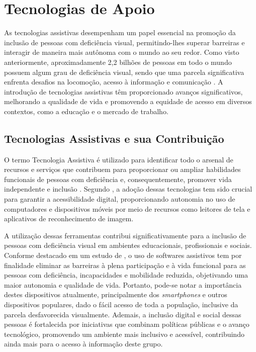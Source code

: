 \section{Tecnologias de Apoio}

As tecnologias assistivas desempenham um papel essencial na promoção da inclusão de pessoas com deficiência visual, permitindo-lhes superar barreiras e interagir de maneira mais autônoma com o mundo ao seu redor. Como visto anteriormente, aproximadamente 2,2 bilhões de pessoas em todo o mundo possuem algum grau de deficiência visual, sendo que uma parcela significativa enfrenta desafios na locomoção, acesso à informação e comunicação \cite{WHO2023}. A introdução de tecnologias assistivas têm proporcionado avanços significativos, melhorando a qualidade de vida e promovendo a equidade de acesso em diversos contextos, como a educação e o mercado de trabalho.

\subsection{Tecnologias Assistivas e sua Contribuição}

O termo Tecnologia Assistiva é utilizado para identificar todo o arsenal de recursos e serviços que contribuem para proporcionar ou ampliar habilidades funcionais de pessoas com deficiência e, consequentemente, promover vida independente e inclusão \cite{bersch2024}. Segundo , a adoção dessas tecnologias tem sido crucial para garantir a acessibilidade digital, proporcionando autonomia no uso de computadores e dispositivos móveis por meio de recursos como leitores de tela e aplicativos de reconhecimento de imagem.

A utilização dessas ferramentas contribui significativamente para a inclusão de pessoas com deficiência visual em ambientes educacionais, profissionais e sociais. Conforme destacado em um estudo de , o uso de softwares assistivos tem por finalidade eliminar as barreiras à plena participação e à vida funcional para as pessoas com deficiência, incapacidades e mobilidade reduzida, objetivando uma maior autonomia e qualidade de vida. Portanto, pode-se notar a importância destes dispositivos atualmente, principalmente dos \textit{smartphones} e outros dispositivos populares, dado o fácil acesso de toda a população, inclusive da parcela desfavorecida visualmente. Ademais, a inclusão digital e social dessas pessoas é fortalecida por iniciativas que combinam políticas públicas e o avanço tecnológico, promovendo um ambiente mais inclusivo e acessível, contribuindo ainda mais para o acesso à informação deste grupo.

